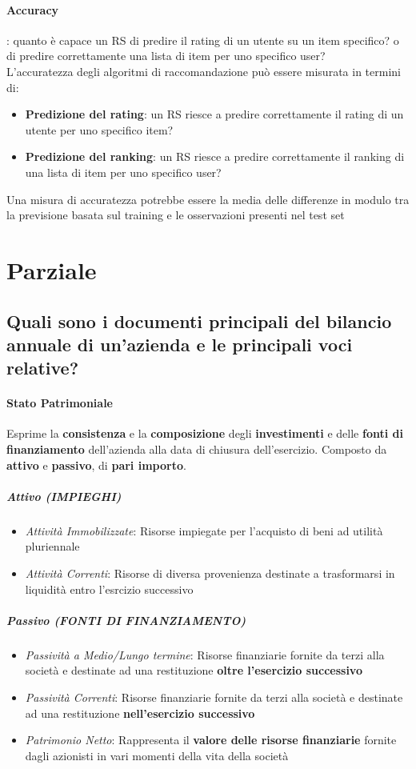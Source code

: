 \documentclass[12pt]{article}
\begin{document}
\paragraph{Accuracy}: quanto è capace un RS di predire il rating di un utente su un item specifico? o di predire correttamente  una lista di item per uno specifico user?
\\
L’accuratezza degli algoritmi di raccomandazione può essere misurata in termini di:
\begin{itemize}
    \item \textbf{Predizione del rating}: un RS riesce a predire correttamente il rating di un utente per uno specifico item?
    \item \textbf{Predizione del ranking}: un RS riesce a predire correttamente il ranking di una lista di item per uno specifico user?
\end{itemize}
Una misura di accuratezza potrebbe essere la media delle differenze in modulo tra la previsione basata sul training e le osservazioni presenti nel test set
\newpage
\section{Parziale}
\subsection{Quali sono i documenti principali del bilancio annuale di un'azienda e le principali voci relative?}
\paragraph{Stato Patrimoniale} Esprime la \textbf{consistenza} e la \textbf{composizione} degli \textbf{investimenti} e delle \textbf{fonti di finanziamento} dell'azienda alla data di chiusura dell'esercizio. Composto da \textbf{attivo} e \textbf{passivo}, di \textbf{pari importo}.
\subparagraph{Attivo (IMPIEGHI)}
\begin{itemize}
    \item \textit{Attività Immobilizzate}: Risorse impiegate per l'acquisto di beni ad utilità pluriennale
    \item \textit{Attività Correnti}: Risorse di diversa provenienza destinate a trasformarsi in liquidità entro l'esrcizio successivo
\end{itemize}
\subparagraph{Passivo (FONTI DI FINANZIAMENTO)}
\begin{itemize}
    \item \textit{Passività a Medio/Lungo termine}: Risorse finanziarie fornite da terzi alla società e destinate ad una restituzione \textbf{oltre l'esercizio successivo}
    \item \textit{Passività Correnti}: Risorse finanziarie fornite da terzi alla società e destinate ad una restituzione \textbf{nell'esercizio successivo}
    \item \textit{Patrimonio Netto}: Rappresenta il \textbf{valore delle risorse finanziarie} fornite dagli azionisti in vari momenti della vita della società
\end{itemize}
\end{document}
